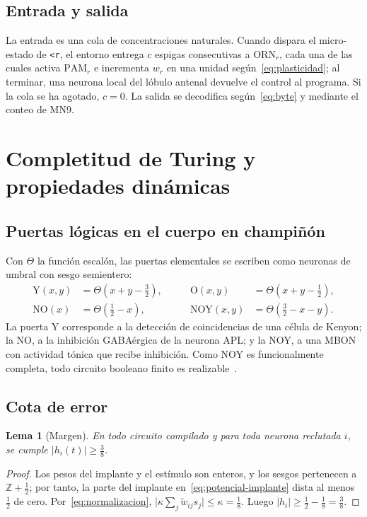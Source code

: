 \documentclass[11pt,a4paper]{article}
\theoremstyle{plain}
\newtheorem{lema}{Lema}
\theoremstyle{definition}
\theoremstyle{remark}
\newcommand{\PAM}{\mathrm{PAM}}
\newcommand{\ORN}{\mathrm{ORN}}
\newcommand{\Z}{\mathbb{Z}}
\begin{document}
\subsection{Entrada y salida}

La entrada es una cola de concentraciones naturales. Cuando dispara el
micro-estado de \texttt{<r}, el entorno entrega $c$ espigas consecutivas a
$\ORN_r$, cada una de las cuales activa $\PAM_r$ e incrementa $w_r$ en una
unidad según~\eqref{eq:plasticidad}; al terminar, una neurona local del
lóbulo antenal devuelve el control al programa. Si la cola se ha agotado,
$c=0$. La salida se decodifica según~\eqref{eq:byte} y mediante el conteo de
MN9.

\section{Completitud de Turing y propiedades dinámicas}
\label{sec:turing}

\subsection{Puertas lógicas en el cuerpo en champiñón}

Con $\Theta$ la función escalón, las puertas elementales se escriben como
neuronas de umbral con sesgo semientero:
\begin{equation}
\begin{aligned}
  \mathrm{Y}(x,y)&=\Theta\!\left(x+y-\tfrac32\right), &\qquad
  \mathrm{O}(x,y)&=\Theta\!\left(x+y-\tfrac12\right),\\
  \mathrm{NO}(x)&=\Theta\!\left(\tfrac12-x\right), &\qquad
  \mathrm{NOY}(x,y)&=\Theta\!\left(\tfrac32-x-y\right).
\end{aligned}
  \label{eq:puertas}
\end{equation}
La puerta Y corresponde a la detección de coincidencias de una célula de
Kenyon; la NO, a la inhibición GABAérgica de la neurona APL; y la NOY, a una
MBON con actividad tónica que recibe inhibición. Como NOY es funcionalmente
completa, todo circuito booleano finito es realizable~\cite{mcculloch1943}.

\subsection{Cota de error}

\begin{lema}[Margen]
\label{lem:margen}
En todo circuito compilado y para toda neurona reclutada $i$, se cumple
$\lvert h_i(t)\rvert \ge \tfrac38$.
\end{lema}
\begin{proof}
Los pesos del implante y el estímulo son enteros, y los sesgos pertenecen a
$\Z+\tfrac12$; por tanto, la parte del implante en~\eqref{eq:potencial-implante}
dista al menos $\tfrac12$ de cero. Por~\eqref{eq:normalizacion},
$\lvert\kappa\sum_j\tilde w_{ij}s_j\rvert \le \kappa=\tfrac18$. Luego
$\lvert h_i\rvert\ge\tfrac12-\tfrac18=\tfrac38$.
\end{proof}
\end{document}
